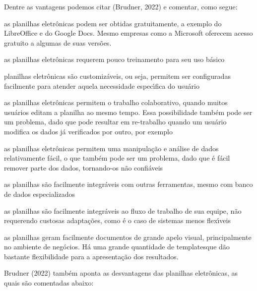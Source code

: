 \documentclass[
12pt,		%
openright,	%
twoside,  %
a4paper,			%
chapter=TITLE,		%
english,			%
french,				%
spanish,			%
brazil				%
]{USPSC-classe/USPSC}
\begin{document}
Dentre as vantagens podemos citar (Brudner, 2022) e comentar, como segue:


















\begin{alineas}
\item as planilhas eletr\^onicas podem ser obtidas gratuitamente, a exemplo do LibreOffice e do Google Docs. Mesmo empresas como a Microsoft oferecem acesso gratuito a algumas de suas vers\~oes.
\item as planilhas eletr\^onicas requerem pouco treinamento para seu uso b\'asico
\item planilhas eletr\^onicas s\~ao \textquotedbl customiz\'aveis\textquotedbl , ou seja, permitem ser configuradas facilmente para atender aquela necessidade espec\'{\i}fica do usu\'ario
\item as planilhas eletr\^onicas permitem o trabalho colaborativo, quando muitos usu\'arios editam a planilha ao mesmo tempo. Essa possibilidade tamb\'em pode ser um problema, dado que pode resultar em re-trabalho quando um usu\'ario modifica os dados j\'a verificados por outro, por exemplo
\item as planilhas eletr\^onicas permitem uma manipula\c{c}\~ao e an\'alise de dados relativamente f\'acil, o que tamb\'em pode ser um problema, dado que \'e f\'acil remover parte dos dados, tornando-os n\~ao confi\'aveis
\item as planilhas s\~ao facilmente integr\'aveis com outras  ferramentas, mesmo com banco de dados especializados
\item as planilhas s\~ao facilmente integr\'aveis ao fluxo de trabalho de sua equipe, n\~ao requerendo custosas adapta\c{c}\~oes, como \'e o caso de sistemas menos flex\'{\i}veis
\item as planilhas geram facilmente documentos de grande apelo visual, principalmente no ambiente de neg\'ocios. H\'a uma grande quantidade de \textquotedbl templates\textquotedbl  que d\~ao bastante flexibilidade para a apresenta\c{c}\~ao dos resultados.
\end{alineas}

 Brudner (2022) tamb\'em aponta as desvantagens das planilhas eletr\^onicas, as quais s\~ao comentadas abaixo:
\end{document}
